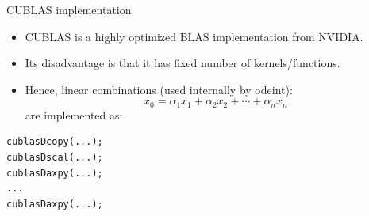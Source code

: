 \documentclass[@BEAMER_OPTIONS@]{beamer}
\begin{document}

\begin{frame}[fragile]{CUBLAS implementation}
    \begin{itemize}
        \item CUBLAS is a highly optimized BLAS implementation from NVIDIA.
        \item Its disadvantage is that it has fixed number of
            kernels/functions.
        \item Hence, linear combinations (used internally by odeint):
            \begin{equation*}
                x_0 = \alpha_1 x_1 + \alpha_2 x_2 + \cdots + \alpha_n x_n
            \end{equation*}
            are implemented as:
    \end{itemize}
    \begin{exampleblock}{}
        \begin{lstlisting}[numbers=none]
cublasDcopy(...);
cublasDscal(...);
cublasDaxpy(...);
...
cublasDaxpy(...);
        \end{lstlisting}
    \end{exampleblock}
\end{frame}
\end{document}

